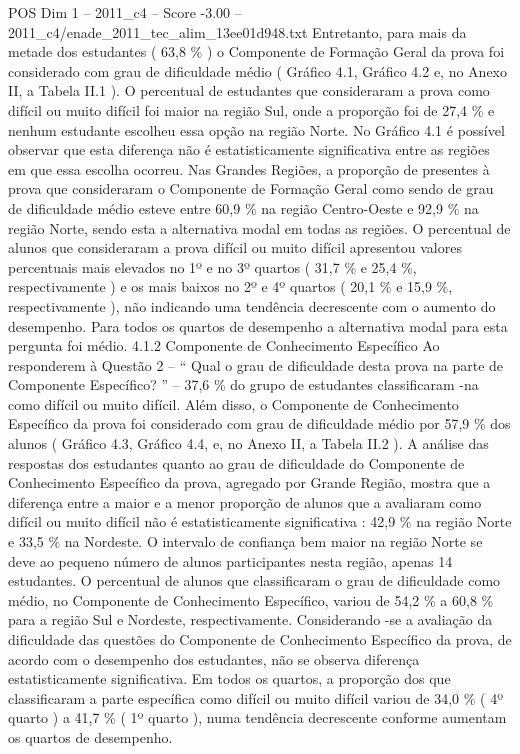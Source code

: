 \begin{textsample}{POS Dim 1 – 2011\_c4 – Score -3.00 – 2011\_c4/enade\_2011\_tec\_alim\_13ee01d948.txt}
Entretanto, para mais da metade dos estudantes ( 63,8 \% ) o Componente de Formação Geral da prova foi considerado com grau de dificuldade médio ( Gráfico 4.1, Gráfico 4.2 e, no Anexo II, a Tabela II.1 ).
O percentual de estudantes que consideraram a prova como difícil ou muito difícil foi maior na região Sul, onde a proporção foi de 27,4 \% e nenhum estudante escolheu essa opção na região Norte.
No Gráfico 4.1 é possível observar que esta diferença não é estatisticamente significativa entre as regiões em que essa escolha ocorreu.
Nas Grandes Regiões, a proporção de presentes à prova que consideraram o Componente de Formação Geral como sendo de grau de dificuldade médio esteve entre 60,9 \% na região Centro-Oeste e 92,9 \% na região Norte, sendo esta a alternativa modal em todas as regiões.
O percentual de alunos que consideraram a prova difícil ou muito difícil apresentou valores percentuais mais elevados no 1º e no 3º quartos ( 31,7 \% e 25,4 \%, respectivamente ) e os mais baixos no 2º e 4º quartos ( 20,1 \% e 15,9 \%, respectivamente ), não indicando uma tendência decrescente com o aumento do desempenho.
Para todos os quartos de desempenho a alternativa modal para esta pergunta foi médio. 4.1.2 Componente de Conhecimento Específico Ao responderem à Questão 2 – “ Qual o grau de dificuldade desta prova na parte de Componente Específico? ” – 37,6 \% do grupo de estudantes classificaram -na como difícil ou muito difícil.
Além disso, o Componente de Conhecimento Específico da prova foi considerado com grau de dificuldade médio por 57,9 \% dos alunos ( Gráfico 4.3, Gráfico 4.4, e, no Anexo II, a Tabela II.2 ).
A análise das respostas dos estudantes quanto ao grau de dificuldade do Componente de Conhecimento Específico da prova, agregado por Grande Região, mostra que a diferença entre a maior e a menor proporção de alunos que a avaliaram como difícil ou muito difícil não é estatisticamente significativa : 42,9 \% na região Norte e 33,5 \% na Nordeste.
O intervalo de confiança bem maior na região Norte se deve ao pequeno número de alunos participantes nesta região, apenas 14 estudantes.
O percentual de alunos que classificaram o grau de dificuldade como médio, no Componente de Conhecimento Específico, variou de 54,2 \% a 60,8 \% para a região Sul e Nordeste, respectivamente.
Considerando -se a avaliação da dificuldade das questões do Componente de Conhecimento Específico da prova, de acordo com o desempenho dos estudantes, não se observa diferença estatisticamente significativa.
Em todos os quartos, a proporção dos que classificaram a parte específica como difícil ou muito difícil variou de 34,0 \% ( 4º quarto ) a 41,7 \% ( 1º quarto ), numa tendência decrescente conforme aumentam os quartos de desempenho.

\end{textsample}
